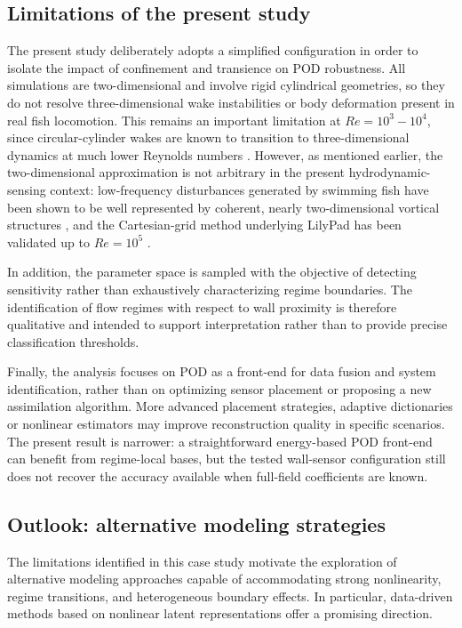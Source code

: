 \documentclass[preprint,12pt]{elsarticle}
\begin{document}
\subsection{Limitations of the present study}
\label{subsec5.2}
The present study deliberately adopts a simplified configuration in order to isolate the impact of confinement and transience on POD robustness. All simulations are two-dimensional and involve rigid cylindrical geometries, so they do not resolve three-dimensional wake instabilities or body deformation present in real fish locomotion. This remains an important limitation at $Re=10^3-10^4$, since circular-cylinder wakes are known to transition to three-dimensional dynamics at much lower Reynolds numbers \citep{Williamson1996}. However, as mentioned earlier, the two-dimensional approximation is not arbitrary in the present hydrodynamic-sensing context: low-frequency disturbances generated by swimming fish have been shown to be well represented by coherent, nearly two-dimensional vortical structures \citep{Hanke2000}, and the Cartesian-grid method underlying LilyPad has been validated up to $Re=10^5$ \citep{Maertens2015}.

In addition, the parameter space is sampled with the objective of detecting sensitivity rather than exhaustively characterizing regime boundaries. The identification of flow regimes with respect to wall proximity is therefore qualitative and intended to support interpretation rather than to provide precise classification thresholds.

Finally, the analysis focuses on POD as a front-end for data fusion and system identification, rather than on optimizing sensor placement or proposing a new assimilation algorithm. More advanced placement strategies, adaptive dictionaries or nonlinear estimators may improve reconstruction quality in specific scenarios. The present result is narrower: a straightforward energy-based POD front-end can benefit from regime-local bases, but the tested wall-sensor configuration still does not recover the accuracy available when full-field coefficients are known.


\subsection{Outlook: alternative modeling strategies}
\label{subsec5.3}
The limitations identified in this case study motivate the exploration of alternative modeling approaches capable of accommodating strong nonlinearity, regime transitions, and heterogeneous boundary effects. In particular, data-driven methods based on nonlinear latent representations offer a promising direction.
\end{document}
